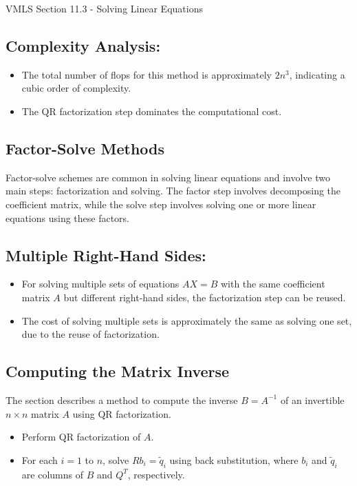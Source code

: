 \begin{notes}{VMLS Section 11.3 - Solving Linear Equations}
    \subsection*{Complexity Analysis:}
    \begin{itemize}
        \item The total number of flops for this method is approximately $2n^3$, indicating a cubic order of complexity.
        \item The QR factorization step dominates the computational cost.
    \end{itemize}

    \subsection*{Factor-Solve Methods}
    Factor-solve schemes are common in solving linear equations and involve two main steps: factorization and solving. The factor step involves decomposing the coefficient matrix, while the solve step 
    involves solving one or more linear equations using these factors. 

    \subsection*{Multiple Right-Hand Sides:}
    \begin{itemize}
        \item For solving multiple sets of equations $AX = B$ with the same coefficient matrix $A$ but different right-hand sides, the factorization step can be reused.
        \item The cost of solving multiple sets is approximately the same as solving one set, due to the reuse of factorization.
    \end{itemize}

    \subsection*{Computing the Matrix Inverse}
    The section describes a method to compute the inverse $B = A^{-1}$ of an invertible $n \times n$ matrix $A$ using QR factorization.

    \begin{highlight}
        \begin{itemize}
            \item Perform QR factorization of $A$.
            \item For each $i = 1$ to $n$, solve $Rb_i = \tilde{q}_i$ using back substitution, where $b_i$ and $\tilde{q}_i$ are columns of $B$ and $Q^T$, respectively.
        \end{itemize}
    \end{highlight}


\end{notes}
